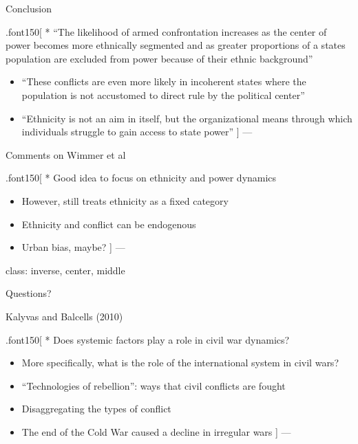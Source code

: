 \documentclass[ignorenonframetext,]{beamer}
\begin{document}
\begin{frame}{Conclusion}

.font150{[} * ``The likelihood of armed confrontation increases as the
center of power becomes more ethnically segmented and as greater
proportions of a states population are excluded from power because of
their ethnic background''

\begin{itemize}
\item
  ``These conflicts are even more likely in incoherent states where the
  population is not accustomed to direct rule by the political center''
\item
  ``Ethnicity is not an aim in itself, but the organizational means
  through which individuals struggle to gain access to state power'' {]}
  ---
\end{itemize}

\end{frame}

\begin{frame}{Comments on Wimmer et al}

.font150{[} * Good idea to focus on ethnicity and power dynamics

\begin{itemize}
\item
  However, still treats ethnicity as a fixed category
\item
  Ethnicity and conflict can be endogenous
\item
  Urban bias, maybe? {]} ---
\end{itemize}

class: inverse, center, middle

\end{frame}

\begin{frame}{Questions?}

\end{frame}

\begin{frame}{Kalyvas and Balcells (2010)}

.font150{[} * Does systemic factors play a role in civil war dynamics?

\begin{itemize}
\item
  More specifically, what is the role of the international system in
  civil wars?
\item
  ``Technologies of rebellion'': ways that civil conflicts are fought
\item
  Disaggregating the types of conflict
\item
  The end of the Cold War caused a decline in irregular wars {]} ---
\end{itemize}

\end{frame}
\end{document}
